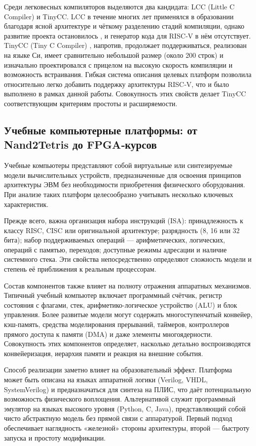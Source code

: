 Среди легковесных компиляторов выделяются два кандидата: LCC (Little C Compiler) и TinyCC. LCC  в течение многих лет применялся в образовании благодаря ясной архитектуре и чёткому разделению стадий компиляции, однако развитие проекта остановилось \cite{LCC}, и генератор кода для RISC‑V в нём отсутствует. TinyCC (Tiny C Compiler) \cite{TinyCC}, напротив, продолжает поддерживаться, реализован на языке Си, имеет сравнительно небольшой размер (около 200 строк) и изначально проектировался с прицелом на высокую скорость компиляции и возможность встраивания. Гибкая система описания целевых платформ позволила относительно легко добавить поддержку архитектуры RISC‑V, что и было выполнено в рамках данной работы. Совокупность этих свойств делает TinyCC соответствующим критериям простоты и расширяемости.

\subsection{Учебные компьютерные платформы: от Nand2Tetris до FPGA‑курсов}

Учебные компьютеры представляют собой виртуальные или синтезируемые модели вычислительных устройств, предназначенные для освоения принципов архитектуры ЭВМ без необходимости приобретения физического оборудования. При анализе таких платформ целесообразно учитывать несколько ключевых характеристик.

Прежде всего, важна организация набора инструкций (ISA): принадлежность к классу RISC, CISC или оригинальной архитектуре; разрядность (8, 16 или 32 бита); набор поддерживаемых операций — арифметических, логических, операций с памятью, переходов; доступные режимы адресации и наличие системного стека. Эти свойства непосредственно определяют сложность модели и степень её приближения к реальным процессорам.

Состав компонентов также влияет на полноту отражения аппаратных механизмов. Типичный учебный компьютер включает программный счётчик, регистр состояния с флагами, стек, арифметико-логическое устройство (ALU) и блок управления. Более развитые модели могут содержать многоступенчатый конвейер, кэш-память, средства моделирования прерываний, таймеров, контроллеров прямого доступа к памяти (DMA) и даже элементы многоядерности. Совокупность этих компонентов определяет, насколько детально воспроизводятся конвейеризация, иерархия памяти и реакция на внешние события.

Способ реализации заметно влияет на образовательный эффект. Платформа может быть описана на языках аппаратной логики (Verilog, VHDL, SystemVerilog) и предназначаться для синтеза на ПЛИС, что даёт потенциальную возможность физического воплощения. Альтернативой служит программный эмулятор на языках высокого уровня (Python, C, Java), представляющий собой чисто абстрактную модель без прямой связи с аппаратурой. Первый подход обеспечивает наглядность «железной» стороны архитектуры, второй — быстроту запуска и простоту модификации.

